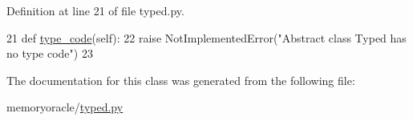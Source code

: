 Definition at line 21 of file typed.\+py.


\begin{DoxyCode}
21     \textcolor{keyword}{def }\hyperlink{classmemoryoracle_1_1typed_1_1Typed_a4670b26e07c52aa65346b1fc22a7e07b}{type\_code}(self):
22         \textcolor{keywordflow}{raise} NotImplementedError(\textcolor{stringliteral}{"Abstract class Typed has no type code"})
23 
\end{DoxyCode}


The documentation for this class was generated from the following file\+:\begin{DoxyCompactItemize}
\item 
memoryoracle/\hyperlink{typed_8py}{typed.\+py}\end{DoxyCompactItemize}
